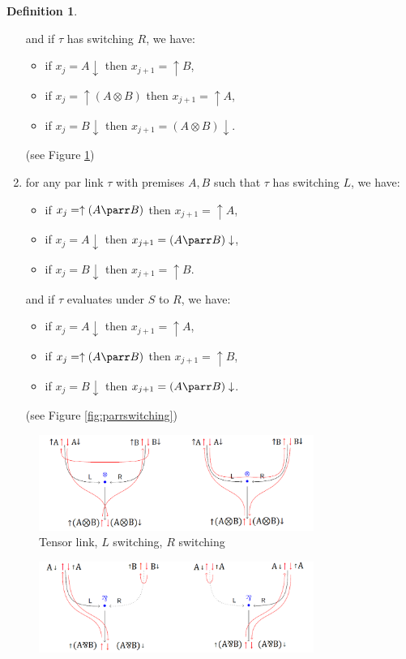 \documentclass[12pt]{article}
\theoremstyle{plain}
\theoremstyle{definition}
\newtheorem{defn}[thm]{Definition} %
\begin{document}
\begin{defn}
\begin{enumerate}
\begin{itemize}
    \end{itemize}
    and if $\tau$ has switching $R$, we have:
    \begin{itemize}
        \item if $x_j = A \downarrow$ then $x_{j+1} = \uparrow B$,
        \item if $x_j = \uparrow (A \otimes B)$ then $x_{j+1} = \uparrow A$,
        \item if $x_j = B \downarrow$ then $x_{j+1} = (A \otimes B) \downarrow$.
    \end{itemize}
    (see Figure \ref{fig:tensorswitching})
    \item\label{def:trip_right_par} for any par link $\tau$ with premises $A,B$ such that $\tau$ has switching $L$, we have:
    \begin{itemize}
        \item if $x_j = \uparrow (A \parr B)$ then $x_{j+1} = \uparrow A$,
        \item if $x_j = A\downarrow$ then $x_{j+1} = (A \parr B)\downarrow$,
        \item if $x_j = B\downarrow$ then $x_{j+1} = \uparrow B$.
    \end{itemize}
    and if $\tau$ evaluates under $S$ to $R$, we have:
    \begin{itemize}
        \item if $x_j = A\downarrow$ then $x_{j+1} = \uparrow A$,
        \item if $x_j = \uparrow (A\parr B)$ then $x_{j+1} = \uparrow B$,
        \item if $x_j = B\downarrow$ then $x_{j+1} = (A\parr B)\downarrow$.
    \end{itemize}
    (see Figure \ref{fig:parrswitching})
\end{enumerate}
\begin{figure}[h]
    \centering
    \includegraphics[width = 0.8\textwidth]{TensorSwitching.png}
    \caption{Tensor link, $L$ switching, $R$ switching}
    \label{fig:tensorswitching}
\end{figure}
\begin{figure}[h]
    \centering
    \includegraphics[width = 0.8\textwidth]{ParrSwitching.png}

\end{figure}
\end{defn}
\end{document}
